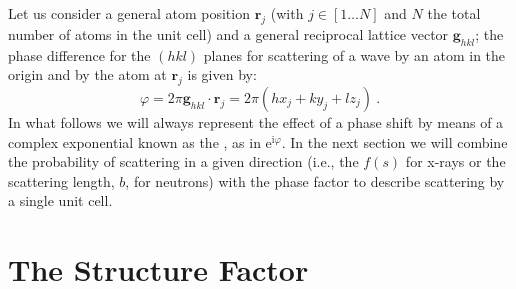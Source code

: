 Let us consider a general atom position $\mathbf{r}_j$ (with $j\in[1\ldots N]$ and $N$ the total number of atoms in the unit cell) and a general reciprocal lattice vector $\mathbf{g}_{hkl}$; the phase difference for the $(hkl)$ planes for scattering of a wave by an atom in the origin and by the atom at $\mathbf{r}_j$ is given by:
\[
	\varphi = 2\pi\mathbf{g}_{hkl}\cdot\mathbf{r}_j = 2\pi(hx_j+ky_j+lz_j)\ .
\]
In what follows we will always represent the effect of a phase shift by means of a complex exponential known as the , as in $\mathrm{e}^{\mathrm{i}\varphi}$. In the next section we will combine the probability of scattering in a given direction (i.e., the  $f(s)$ for x-rays or the scattering length, $b$, for neutrons) with the phase factor to describe scattering by a single unit cell.


\section{The Structure Factor}\label{\chabbr:sec:structurefactor}

